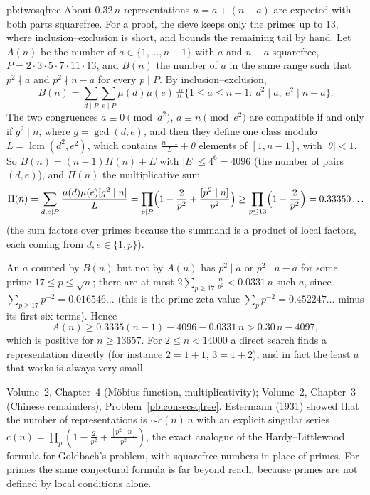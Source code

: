 \begin{solution}{pb:twosqfree}
\idea About $0.32\,n$ representations $n=a+(n-a)$ are expected with both parts squarefree. For a proof, the sieve keeps only the primes up to $13$, where inclusion--exclusion is short, and bounds the remaining tail by hand.
\writeup Let $A(n)$ be the number of $a\in\{1,\dots,n-1\}$ with $a$ and $n-a$ squarefree, $P=2\cdot3\cdot5\cdot7\cdot11\cdot13$, and
$B(n)$ the number of $a$ in the same range such that $p^2\nmid a$ and $p^2\nmid n-a$ for every $p\mid P$. By inclusion--exclusion,
\[
B(n)=\sum_{d\mid P}\sum_{e\mid P}\mu(d)\mu(e)\,\#\{1\le a\le n-1:\ d^2\mid a,\ e^2\mid n-a\}.
\]
The two congruences $a\equiv0\pmod{d^2}$, $a\equiv n\pmod{e^2}$ are compatible if and only if $g^2\mid n$, where $g=\gcd(d,e)$, and
then they define one class modulo $L=\operatorname{lcm}(d^2,e^2)$, which contains $\frac{n-1}L+\theta$ elements of $[1,n-1]$, with
$|\theta|<1$. So $B(n)=(n-1)\Pi(n)+E$ with $|E|\le4^6=4096$ (the number of pairs $(d,e)$), and $\Pi(n)$ the multiplicative sum
\[
\Pi(n)=\sum_{d,e\mid P}\frac{\mu(d)\mu(e)[g^2\mid n]}L=\prod_{p\mid P}\Bigl(1-\frac2{p^2}+\frac{[p^2\mid n]}{p^2}\Bigr)\ge\prod_{p\le13}\Bigl(1-\frac2{p^2}\Bigr)=0.33350\ldots
\]
(the sum factors over primes because the summand is a product of local factors, each coming from $d,e\in\{1,p\}$).

An $a$ counted by $B(n)$ but not by $A(n)$ has $p^2\mid a$ or $p^2\mid n-a$ for some prime $17\le p\le\sqrt n$; there are at most
$2\sum_{p\ge17}\frac n{p^2}<0.0331\,n$ such $a$, since $\sum_{p\ge17}p^{-2}=0.016546\ldots$ (this is the prime zeta value
$\sum_pp^{-2}=0.452247\ldots$ minus its first six terms). Hence
\[
A(n)\ge0.3335(n-1)-4096-0.0331\,n>0.30\,n-4097,
\]
which is positive for $n\ge13657$. For $2\le n<14000$ a direct search finds a representation directly (for instance $2=1+1$, $3=1+2$),
and in fact the least $a$ that works is always very small.

\tools Volume~2, Chapter~4 (Möbius function, multiplicativity); Volume~2, Chapter~3 (Chinese remainders); Problem~\ref{pb:consecsqfree}.
\leads Estermann (1931) showed that the number of representations is $\sim c(n)\,n$ with an explicit singular series
$c(n)=\prod_p(1-\frac2{p^2}+\frac{[p^2\mid n]}{p^2})$, the exact analogue of the Hardy--Littlewood formula for Goldbach's problem,
with squarefree numbers in place of primes. For primes the same conjectural formula is far beyond reach, because primes are
not defined by local conditions alone.
\end{solution}

